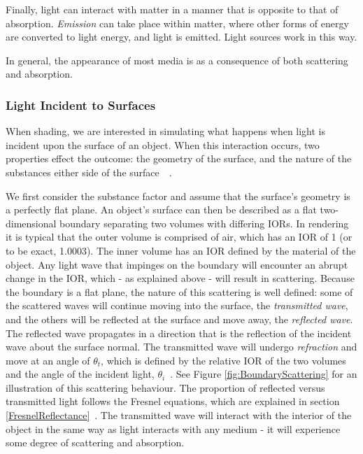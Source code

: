 Finally, light can interact with matter in a manner that is opposite to that of absorption. \textit{Emission} can take place within matter, where other forms of energy are converted to light energy, and light is emitted. Light sources work in this way.

In general, the appearance of most media is as a consequence of both scattering and absorption.

\subsubsection{Light Incident to Surfaces}

When shading, we are interested in simulating what happens when light is incident upon the surface of an object. When this interaction occurs, two properties effect the outcome: the geometry of the surface, and the nature of the substances either side of the surface~\cite{RTR4}~\cite{DiffuseSpecularAtSurfaces}.

We first consider the substance factor and assume that the surface's geometry is a perfectly flat plane. An object's surface can then be described as a flat two-dimensional boundary separating two volumes with differing IORs. In rendering it is typical that the outer volume is comprised of air, which has an IOR of 1 (or to be exact, 1.0003). The inner volume has an IOR defined by the material of the object. Any light wave that impinges on the boundary will encounter an abrupt change in the IOR, which - as explained above - will result in scattering. Because the boundary is a flat plane, the nature of this scattering is well defined: some of the scattered waves will continue moving into the surface, the \textit{transmitted wave}, and the others will be reflected at the surface and move away, the \textit{reflected wave}. The reflected wave propagates in a direction that is the reflection of the incident wave about the surface normal. The transmitted wave will undergo \textit{refraction} and move at an angle of \begin{math}\theta_t\end{math}, which is defined by the relative IOR of the two volumes and the angle of the incident light, \begin{math}\theta_i\end{math}~\cite{SnellsLaw}. See Figure \ref{fig:BoundaryScattering} for an illustration of this scattering behaviour. The proportion of reflected versus transmitted light follows the Fresnel equations, which are explained in section \ref{FresnelReflectance}~\cite{PractitionersReflectionModels}. The transmitted wave will interact with the interior of the object in the same way as light interacts with any medium - it will experience some degree of scattering and absorption.

